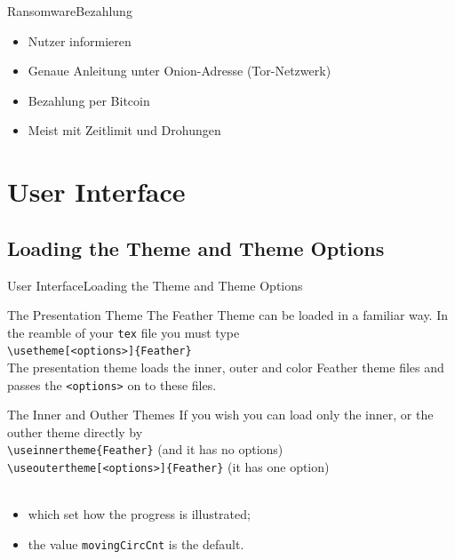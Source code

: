 \documentclass[notes,10pt]{beamer}
\begin{document}
\begin{frame}{Ransomware}{Bezahlung}
	\begin{itemize}
		\item Nutzer informieren
		\item Genaue Anleitung unter Onion-Adresse (Tor-Netzwerk)
		\item Bezahlung per Bitcoin
		\item Meist mit Zeitlimit und Drohungen
	\end{itemize}
\end{frame}





\section{User Interface}
\subsection{Loading the Theme and Theme Options}
\begin{frame}{User Interface}{Loading the Theme and Theme Options}

  \begin{block}{The Presentation Theme}
    The Feather Theme can be loaded in a familiar way. In the reamble of your {\tt tex} file you must type\\ \vspace{5pt} 
    {\tt \textbackslash usetheme[<options>]\{Feather\}}\\ \vspace{5pt} 
    The presentation theme loads the inner, outer and color Feather theme files and passes the {\tt <options>} on to these files.
  \end{block}
  \begin{block}{The Inner and Outher Themes}
    If you wish you can load only the inner, or the outher theme directly by\\ \vspace{5pt} 
    {\tt \textbackslash useinnertheme\{Feather\}} (and it has no options)\\ \vspace{5pt} 
    {\tt \textbackslash useoutertheme[<options>]\{Feather\}} (it has one option)\\
     \\
    \begin{itemize}
    \item which set how the progress is illustrated;
    \item the value {\tt movingCircCnt} is the default.
    \end{itemize}
  \end{block}
\end{frame}
\end{document}
